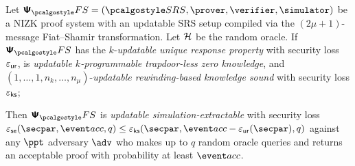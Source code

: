 
\begin{theorem}
	\label{thm:se}
	Let $\psfs = (\SRScer, \prover, \verifier, \simulator)$ be a NIZK proof system with an updatable SRS setup compiled via the $(2\mu + 1)$-message Fiat--Shamir transformation. Let $\mathcal{H}$ be the random oracle. If $\psfs$ has the
	$k$-\emph{updatable unique response property} with security loss $\varepsilon_{\mathsf{ur}}$, is
	\emph{updatable $k$-programmable trapdoor-less zero knowledge}, and $(1, \ldots, 1, n_{k}, \ldots, n_\mu)$-\emph{updatable rewinding-based knowledge sound} with security loss $\varepsilon_{\mathsf{ks}}$; 
	
	Then $\psfs$ is \emph{updatable simulation-extractable} with security loss $\epsse(\secpar,\accProb,q) \leq \epscss(\secpar,\accProb - \epsur(\secpar),q)$ against any $\ppt$ adversary $\advse$ who makes up to $q$ random oracle queries and returns an acceptable proof with probability at least $\accProb$.
\end{theorem}

